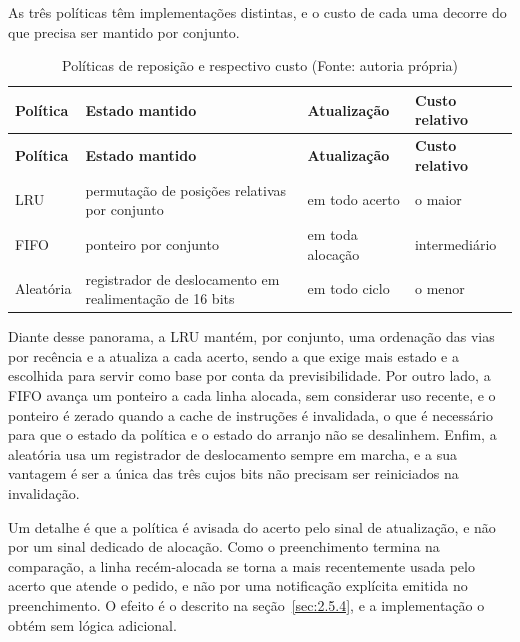 As três políticas têm implementações distintas, e o custo de cada uma decorre do que precisa ser mantido por conjunto.

{\small
\begin{longtable}{@{}>{\raggedright\arraybackslash}p{}>{\raggedright\arraybackslash}p{}>{\raggedright\arraybackslash}p{}>{\raggedright\arraybackslash}p{}@{}}
\caption[Políticas de reposição e respectivo custo]{Políticas de reposição e respectivo custo (Fonte: autoria própria)}\label{tab:3.6}\\
\hline
\textbf{Política} & \textbf{Estado mantido} & \textbf{Atualização} & \textbf{Custo relativo} \\
\hline
\endfirsthead
\hline
\textbf{Política} & \textbf{Estado mantido} & \textbf{Atualização} & \textbf{Custo relativo} \\
\hline
\endhead
\hline
\endlastfoot
LRU & permutação de posições relativas por conjunto & em todo acerto & o maior \\
FIFO & ponteiro por conjunto & em toda alocação & intermediário \\
Aleatória & registrador de deslocamento em realimentação de 16 bits & em todo ciclo & o menor \\
\end{longtable}
}

Diante desse panorama, a LRU mantém, por conjunto, uma ordenação das vias por recência e a atualiza a cada acerto, sendo a que exige mais estado e a escolhida para servir como base por conta da previsibilidade. Por outro lado, a FIFO avança um ponteiro a cada linha alocada, sem considerar uso recente, e o ponteiro é zerado quando a cache de instruções é invalidada, o que é necessário para que o estado da política e o estado do arranjo não se desalinhem. Enfim, a aleatória usa um registrador de deslocamento sempre em marcha, e a sua vantagem é ser a única das três cujos bits não precisam ser reiniciados na invalidação.

Um detalhe é que a política é avisada do acerto pelo sinal de atualização, e não por um sinal dedicado de alocação. Como o preenchimento termina na comparação, a linha recém-alocada se torna a mais recentemente usada pelo acerto que atende o pedido, e não por uma notificação explícita emitida no preenchimento. O efeito é o descrito na seção~\ref{sec:2.5.4}, e a implementação o obtém sem lógica adicional.

